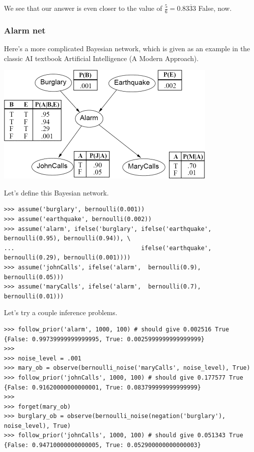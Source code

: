 \documentclass[11pt]{article}
\begin{document}
\noindent We see that our answer is even closer to the value of $\frac{5}{6} = 0.8\overline{333}$ False, now.

\subsubsection{Alarm net}

Here's a more complicated Bayesian network, which is given as an example in the classic AI textbook Artificial Intelligence (A Modern Approach).  
\begin{center} \includegraphics{burglary.png} \end{center}

\noindent Let's define this Bayesian network.

\begin{small}
\begin{verbatim}
>>> assume('burglary', bernoulli(0.001))
>>> assume('earthquake', bernoulli(0.002))
>>> assume('alarm', ifelse('burglary', ifelse('earthquake', bernoulli(0.95), bernoulli(0.94)), \
...                                    ifelse('earthquake', bernoulli(0.29), bernoulli(0.001))))
>>> assume('johnCalls', ifelse('alarm',  bernoulli(0.9), bernoulli(0.05)))
>>> assume('maryCalls', ifelse('alarm',  bernoulli(0.7), bernoulli(0.01)))
\end{verbatim}
\end{small}

\noindent Let's try a couple inference problems.

\begin{small}
\begin{verbatim}
>>> follow_prior('alarm', 1000, 100) # should give 0.002516 True
{False: 0.99739999999999995, True: 0.0025999999999999999}
>>>
>>> noise_level = .001
>>> mary_ob = observe(bernoulli_noise('maryCalls', noise_level), True)
>>> follow_prior('johnCalls', 1000, 100) # should give 0.177577 True
{False: 0.91620000000000001, True: 0.083799999999999999}
>>>
>>> forget(mary_ob)
>>> burglary_ob = observe(bernoulli_noise(negation('burglary'), noise_level), True)
>>> follow_prior('johnCalls', 1000, 100) # should give 0.051343 True
{False: 0.94710000000000005, True: 0.052900000000000003}
\end{verbatim}
\end{small}
\end{document}
